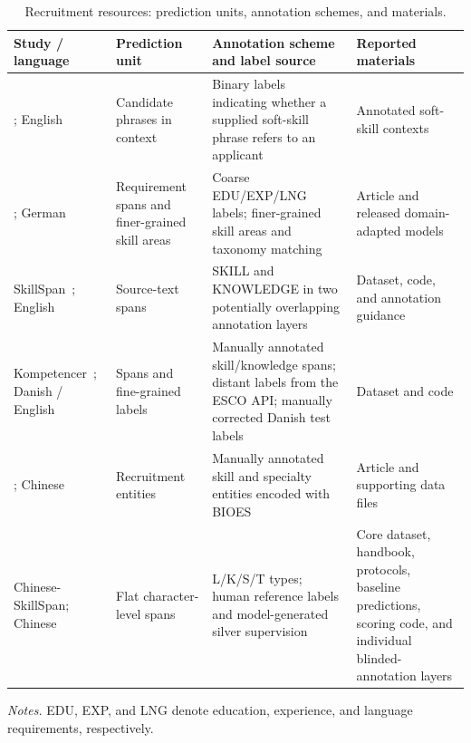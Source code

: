 \begin{table}[!htbp]
\centering\small
\caption{Recruitment resources: prediction units, annotation schemes, and materials.}
\label{tab:related-span}
\setlength{\tabcolsep}{4pt}\renewcommand{\arraystretch}{1.13}
\begin{tabularx}{\linewidth}{@{}P{.20\linewidth}P{.17\linewidth}P{.34\linewidth}L@{}}
\toprule
Study / language & Prediction unit & Annotation scheme and label source & Reported materials \\
\midrule
\citet{sayfullina2018softskills}; English & Candidate phrases in context & Binary labels indicating whether a supplied soft-skill phrase refers to an applicant & Annotated soft-skill contexts \\
\citet{gnehm2022skills}; German & Requirement spans and finer-grained skill areas & Coarse EDU/EXP/LNG labels; finer-grained skill areas and taxonomy matching & Article and released domain-adapted models \\
SkillSpan~\citep{zhang2022skillspan}; English & Source-text spans & SKILL and KNOWLEDGE in two potentially overlapping annotation layers & Dataset, code, and annotation guidance \\
Kompetencer~\citep{jensen2022kompetencer}; Danish / English & Spans and fine-grained labels & Manually annotated skill/knowledge spans; distant labels from the ESCO API; manually corrected Danish test labels & Dataset and code \\
\citet{cao2021occupational}; Chinese & Recruitment entities & Manually annotated skill and specialty entities encoded with BIOES & Article and supporting data files \\
Chinese-SkillSpan; Chinese & Flat character-level spans & L/K/S/T types; human reference labels and model-generated silver supervision & Core dataset, handbook, protocols, baseline predictions, scoring code, and individual blinded-annotation layers \\
\bottomrule
\end{tabularx}
\par\smallskip
{\footnotesize\RaggedRight\textit{Notes.} EDU, EXP, and LNG denote education, experience, and language requirements, respectively.\par}
\end{table}
